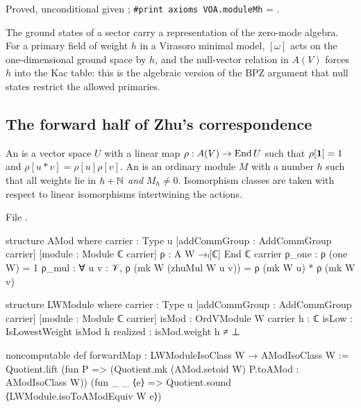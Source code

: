 \begin{status}
Proved, unconditional given ; \texttt{\#print axioms VOA.moduleMh} = .
\end{status}

\begin{physics}
The ground states of a sector carry a representation of the zero-mode algebra. For a primary field of weight $h$
in a Virasoro minimal model, $[\omega]$ acts on the one-dimensional ground space by $h$, and the null-vector
relation in $A(V)$ forces $h$ into the Kac table: this is the algebraic version of the BPZ argument that null
states restrict the allowed primaries.
\end{physics}

\subsection{The forward half of Zhu's correspondence}

\begin{definition}\label{l12:def:lwmodule}
An  is a vector space $U$ with a linear map $\rho:A(V)\to\operatorname{End} U$ such that $\rho[\mathbf{1}] = 1$ and
$\rho[u*v] = \rho[u]\rho[v]$. An  is an ordinary module $M$ with a number $h$ such that all weights lie
in $h+{\mathbb{N}}$ \emph{and} $M_h\neq0$. Isomorphism classes are taken with respect to linear isomorphisms intertwining
the actions.
\end{definition}
\noindent File .
\begin{leancode}
structure AMod where
  carrier : Type u
  [addCommGroup : AddCommGroup carrier]
  [module : Module ℂ carrier]
  ρ : A W →ₗ[ℂ] End ℂ carrier
  ρ_one : ρ (one W) = 1
  ρ_mul : ∀ u v : 𝒱, ρ (mk W (zhuMul W u v)) = ρ (mk W u) * ρ (mk W v)

structure LWModule where
  carrier : Type u
  [addCommGroup : AddCommGroup carrier]
  [module : Module ℂ carrier]
  isMod : OrdVModule W carrier
  h : ℂ
  isLow : IsLowestWeight isMod h
  realized : isMod.weight h ≠ ⊥

noncomputable def forwardMap : LWModuleIsoClass W → AModIsoClass W :=
  Quotient.lift (fun P => (Quotient.mk (AMod.setoid W) P.toAMod : AModIsoClass W))
    (fun _ _ ⟨e⟩ => Quotient.sound ⟨LWModule.isoToAModEquiv W e⟩)
\end{leancode}

